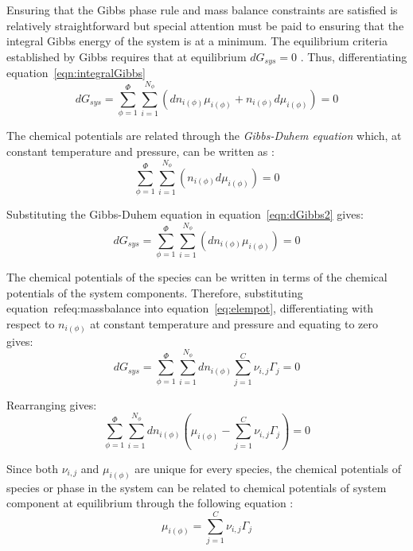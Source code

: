 		Ensuring that the Gibbs phase rule and mass balance constraints are satisfied is relatively straightforward but special attention must be paid to ensuring that the integral Gibbs energy of the system is at a minimum. The equilibrium criteria established by Gibbs requires that at equilibrium $d G_{sys} = 0$ \cite{Gibbs:1878aa}. Thus, differentiating equation~\ref{eqn:integralGibbs}
		\begin{equation}\label{eqn:dGibbs1}
			d G_{sys} = \sum_{\phi=1}^{\Phi} \sum_{i=1}^{N_{\phi}} \left( d n_{i(\phi)}\mu_{i(\phi)} + n_{i(\phi)} d \mu_{i(\phi)}\right) = 0
		\end{equation}
		
		The chemical potentials are related through the \emph{Gibbs-Duhem equation} which, at constant temperature and pressure, can be written as \cite{Olander08}:
		\begin{equation}\label{eqn:dGibbs2}
			\sum_{\phi=1}^{\Phi} \sum_{i=1}^{N_{\phi}} \left( n_{i(\phi)} d \mu_{i(\phi)}\right) = 0
		\end{equation}
		
		Substituting the Gibbs-Duhem equation in equation~\ref{eqn:dGibbs2} gives:
		\begin{equation}\label{eqn:dGibbs3}
			d G_{sys} = \sum_{\phi=1}^{\Phi} \sum_{i=1}^{N_{\phi}} \left( d n_{i(\phi)}\mu_{i(\phi)} \right) = 0
		\end{equation}
		
		The chemical potentials of the species can be written in terms of the chemical potentials of the system components. Therefore, substituting equation~ref{eq:massbalance} into equation~\ref{eq:elempot}, differentiating with respect to $n_{i(\phi)}$ at constant temperature and pressure and equating to zero gives:
		\begin{equation}\label{eqn:dGibbs4}
			d G_{sys} = \sum_{\phi=1}^{\Phi} \sum_{i=1}^{N_{\phi}}  d n_{i(\phi)}\sum_{j=1}^{C}\nu_{i,j}\Gamma_j  = 0
		\end{equation}
		
		Rearranging gives:
		\begin{equation}\label{eqn:dGibbs5}
			\sum_{\phi=1}^{\Phi} \sum_{i=1}^{N_{\phi}}  d n_{i(\phi)} \left( \mu_{i(\phi)} - \sum_{j=1}^{C}\nu_{i,j}\Gamma_j \right) = 0
		\end{equation}
		
		Since both $\nu_{i,j}$ and $\mu_{i(\phi)}$ are unique for every species, the chemical potentials of species or phase in the system can be related to chemical potentials of system component at equilibrium through the following equation \cite{vanZeggeren11}:
		\begin{equation}\label{eqn:dGibbs6}
			\mu_{i(\phi)} = \sum_{j=1}^{C}\nu_{i,j}\Gamma_j
		\end{equation}
		
